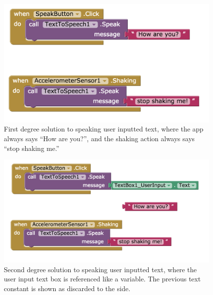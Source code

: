 \begin{figure}
  \centering
      \includegraphics[width=\textwidth]{images/debugActivity/debug1shaking}
  \caption[First degree solutions to the Debugging Activity]{First degree solution to speaking user inputted text, where the app always says ``How are you?'', and the shaking action always says ``stop shaking me.''}
  \label{fig:debug1}
\end{figure}

\begin{figure}
  \centering
      \includegraphics[width=\textwidth]{images/debugActivity/debug2input}
  \caption[Second degree solution to speaking user inputted text]{Second degree solution to speaking user inputted text, where the user input text box is referenced like a variable. The previous text constant is shown as discarded to the side.}
  \label{fig:debug2}
\end{figure}

